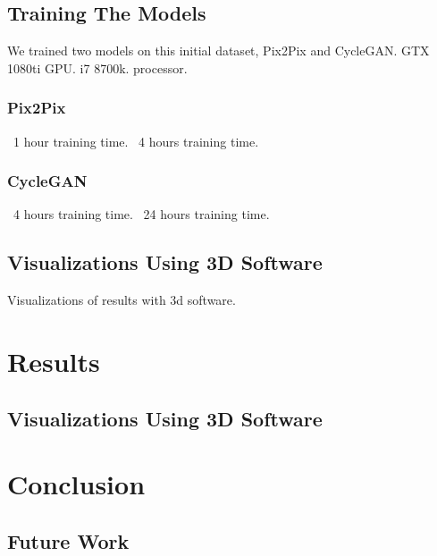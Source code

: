 \documentclass[twocolumn]{article}
\begin{document}
	\subsection{Training The Models}
	
	We trained two models on this initial dataset, Pix2Pix and CycleGAN. GTX 1080ti GPU. i7 8700k. processor.
	
	\subsubsection{Pix2Pix}
	~1 hour training time.
	~4 hours training time.
	
	\subsubsection{CycleGAN}
	~4 hours training time.
	~24 hours training time.

	\subsection{Visualizations Using 3D Software}
	
	Visualizations of results with 3d software.

	\section{Results}
	
	\subsection{Visualizations Using 3D Software}

	\section{Conclusion}
	
	\subsection{Future Work}
	
	
	
\end{document}
